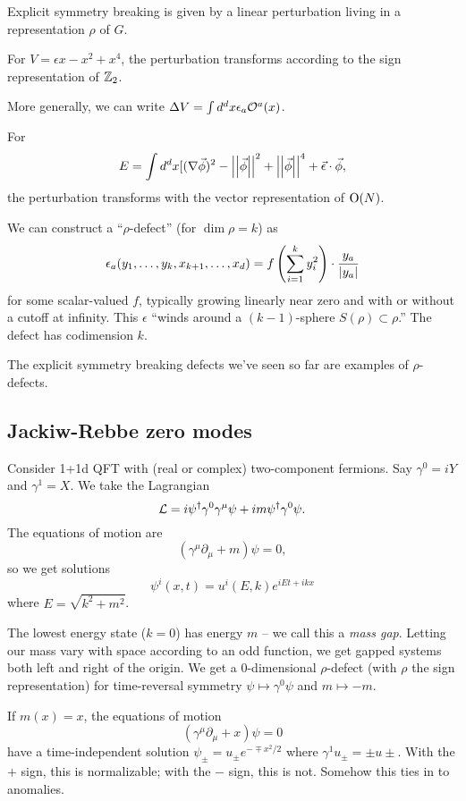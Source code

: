 Explicit symmetry breaking is given by a linear perturbation living in a representation $\rho$ of $G$.

\begin{ex}
	For $V = \epsilon x - x^2 + x^4$, the perturbation transforms according to the sign representation of $\mathbb{Z}_2$.
\end{ex}

More generally, we can write $\Delta V = \int d^d x \epsilon_a \mathcal{O}^a(x)$.

\begin{ex}
	For
	\[
		E = \int d^d x [(\nabla \vec{\phi})^2 - \left|\left|{\vec{\phi}}\right|\right|^2 + \left|\left|{\vec{\phi}}\right|\right|^4 + \vec{\epsilon} \cdot \vec{\phi},
	\]
	the perturbation transforms with the vector representation of $\mathrm{O}(N)$.
\end{ex}

We can construct a ``$\rho$-defect'' (for $\dim \rho = k$) as
\[
	\epsilon_a(y_1, \dots, y_k, x_{k+1}, \dots, x_d) = f\left(\sum_{i=1}^k y_i^2\right) \cdot \frac{y_a}{\left|{y_a}\right|}
\]
for some scalar-valued $f$, typically growing linearly near zero and with or without a cutoff at infinity.
This $\epsilon$ ``winds around a $(k-1)$-sphere $S(\rho) \subset \rho$.''
The defect has codimension $k$.

The explicit symmetry breaking defects we've seen so far are examples of $\rho$-defects.

\subsection{Jackiw-Rebbe zero modes}

Consider 1+1d QFT with (real or complex) two-component fermions.
Say $\gamma^0 = i Y$ and $\gamma^1 = X$.
We take the Lagrangian
\[
	\mathcal{L} = i \psi^\dagger \gamma^0 \gamma^\mu \psi + i m \psi^\dagger \gamma^0 \psi.
\]
The equations of motion are
\[
	(\gamma^\mu \partial_\mu + m) \psi = 0,
\]
so we get solutions 
\[
	\psi^i(x, t) = u^i(E, k) e^{i E t + i k x}
\]
where $E = \sqrt{k^2 + m^2}$.

The lowest energy state ($k = 0$) has energy $m$ -- we call this a \emph{mass gap}.
Letting our mass vary with space according to an odd function, we get gapped systems both left and right of the origin.
We get a 0-dimensional $\rho$-defect (with $\rho$ the sign representation) for time-reversal symmetry $\psi \mapsto \gamma^0 \psi$ and $m \mapsto -m$.

If $m(x) = x$, the equations of motion
\[
	(\gamma^\mu \partial_\mu + x) \psi = 0
\]
have a time-independent solution $\psi_{\pm} = u_{\pm} e^{-\mp x^2/ 2}$ where $\gamma^1 u_{\pm} = \pm u \pm$.
With the $+$ sign, this is normalizable; with the $-$ sign, this is not.
Somehow this ties in to anomalies.

